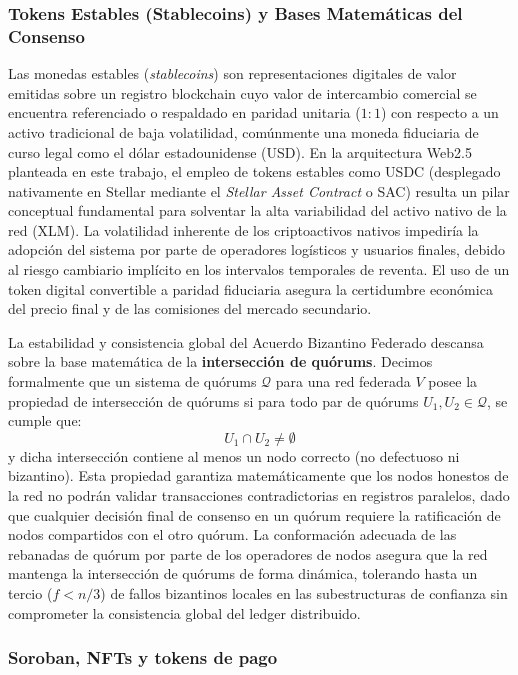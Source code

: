 \subsubsection{Tokens Estables (Stablecoins) y Bases Matemáticas del Consenso}

Las monedas estables (\textit{stablecoins}) son representaciones digitales de valor emitidas sobre un registro blockchain cuyo valor de intercambio comercial se encuentra referenciado o respaldado en paridad unitaria ($1:1$) con respecto a un activo tradicional de baja volatilidad, comúnmente una moneda fiduciaria de curso legal como el dólar estadounidense (USD). En la arquitectura Web2.5 planteada en este trabajo, el empleo de tokens estables como USDC (desplegado nativamente en Stellar mediante el \textit{Stellar Asset Contract} o SAC) resulta un pilar conceptual fundamental para solventar la alta variabilidad del activo nativo de la red (XLM). La volatilidad inherente de los criptoactivos nativos impediría la adopción del sistema por parte de operadores logísticos y usuarios finales, debido al riesgo cambiario implícito en los intervalos temporales de reventa. El uso de un token digital convertible a paridad fiduciaria asegura la certidumbre económica del precio final y de las comisiones del mercado secundario.

La estabilidad y consistencia global del Acuerdo Bizantino Federado descansa sobre la base matemática de la \textbf{intersección de quórums}. Decimos formalmente que un sistema de quórums $\mathcal{Q}$ para una red federada $V$ posee la propiedad de intersección de quórums si para todo par de quórums $U_1, U_2 \in \mathcal{Q}$, se cumple que:
\begin{equation}
U_1 \cap U_2 \neq \emptyset
\end{equation}
y dicha intersección contiene al menos un nodo correcto (no defectuoso ni bizantino). Esta propiedad garantiza matemáticamente que los nodos honestos de la red no podrán validar transacciones contradictorias en registros paralelos, dado que cualquier decisión final de consenso en un quórum requiere la ratificación de nodos compartidos con el otro quórum. La conformación adecuada de las rebanadas de quórum por parte de los operadores de nodos asegura que la red mantenga la intersección de quórums de forma dinámica, tolerando hasta un tercio ($f < n/3$) de fallos bizantinos locales en las subestructuras de confianza sin comprometer la consistencia global del ledger distribuido.


\subsubsection{Soroban, NFTs y tokens de pago}


